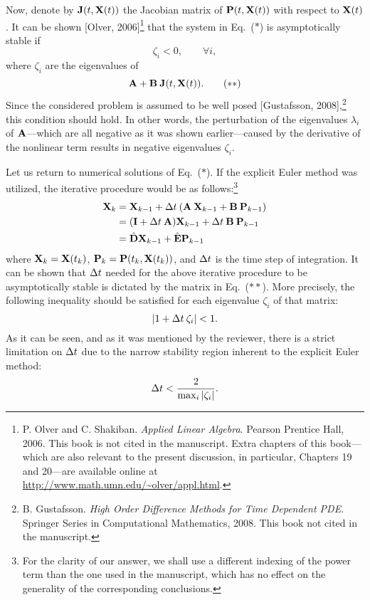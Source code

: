\begin{authors}
Now, denote by $\m{J}(\t, \vX(\t))$ the Jacobian matrix of $\mathbf{P}(t, \mathbf{X}(t))$ with respect to $\mathbf{X}(t)$.
It can be shown [Olver, 2006]\footnote{P. Olver and C. Shakiban. \emph{Applied Linear Algebra}. Pearson Prentice Hall, 2006. This book is not cited in the manuscript. Extra chapters of this book---which are also relevant to the present discussion, in particular, Chapters 19 and 20---are available online at \url{http://www.math.umn.edu/~olver/appl.html}.} that the system in Eq.~($\ast$) is asymptotically stable if
\[
  \zeta_i < 0, \qquad \forall i,
\]
where $\zeta_i$ are the eigenvalues of
\begin{equation}
  \mA + \mB \: \m{J}(\t, \vX(\t)). \tag{$\ast\ast$}
\end{equation}
Since the considered problem is assumed to be well posed [Gustafsson, 2008],\footnote{B. Gustafsson. \emph{High Order Difference Methods for Time Dependent PDE}. Springer Series in Computational Mathematics, 2008. This book not cited in the manuscript.} this condition should hold.
In other words, the perturbation of the eigenvalues $\lambda_i$ of $\mA$---which are all negative as it was shown earlier---caused by the derivative of the nonlinear term results in negative eigenvalues $\zeta_i$.

Let us return to numerical solutions of Eq.~($\ast$).
If the explicit Euler method was utilized, the iterative procedure would be as follows:\footnote{For the clarity of our answer, we shall use a different indexing of the power term than the one used in the manuscript, which has no effect on the generality of the corresponding conclusions.}
\begin{align*}
  \vX_k & = \vX_{k - 1} + \Delta \t \: (\mA \: \vX_{k - 1} + \mB \: \vP_{k - 1}) \\
  & = (\mI + \Delta \t \: \mA) \vX_{k - 1} + \Delta \t \: \mB \: \vP_{k - 1} \\
  & = \hat{\mCF} \vX_{k - 1} + \hat{\mCS} \vP_{k - 1}
\end{align*}
where $\mathbf{X}_k = \mathbf{X}(t_k)$, $\mathbf{P}_k = \mathbf{P}(t_k, \mathbf{X}(t_k))$, and $\Delta t$ is the time step of integration.
It can be shown that $\Delta t$ needed for the above iterative procedure to be asymptotically stable is dictated by the matrix in Eq.~($\ast\ast$).
More precisely, the following inequality should be satisfied for each eigenvalue $\zeta_i$ of that matrix:
\[
  |1 + \Delta t \: \zeta_i | < 1.
\]
As it can be seen, and as it was mentioned by the reviewer, there is a strict limitation on $\Delta t$ due to the narrow stability region inherent to the explicit Euler method:
\[
  \Delta t < \frac{2}{\max_i |\zeta_i|}.
\]


\end{authors}
